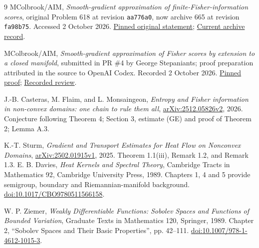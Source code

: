 \documentclass[11pt]{article}
\begin{document}
\begin{thebibliography}{9}
MColbrook/AIM, \emph{Smooth-gradient approximation of finite-Fisher-information scores}, original Problem 618 at revision \texttt{aa776a0}, now archive 665 at revision \texttt{fa98b75}. Accessed 2 October 2026.\newline
\href{https://github.com/MColbrook/AIM/blob/aa776a01d7d48a79f93251af11fde9454b0aea95/problems/618-fisher-score-gradient-closure.md}{Pinned original statement};
\href{https://github.com/MColbrook/AIM/blob/fa98b7525fa3f78317536a8825f9cfa0ae1c369c/research/resolved/665-fisher-score-gradient-closure.md}{Current archive record}.

MColbrook/AIM, \emph{Smooth-gradient approximation of Fisher scores by extension to a closed manifold}, submitted in PR \#4 by George Stepaniants; proof preparation attributed in the source to OpenAI Codex. Recorded 2 October 2026.\newline
\href{https://github.com/MColbrook/AIM/blob/fa98b7525fa3f78317536a8825f9cfa0ae1c369c/research/solutions/618-fisher-score/PROOF.md}{Pinned proof};
\href{https://github.com/MColbrook/AIM/blob/fa98b7525fa3f78317536a8825f9cfa0ae1c369c/research/solution_reviews/2026-10-02/618-review.md}{Recorded review}.

J.-B. Casteras, M. Flaim, and L. Monsaingeon,
\emph{Entropy and Fisher information in non-convex domains: one chain to rule them all},
\href{https://arxiv.org/abs/2512.05826v2}{arXiv:2512.05826v2}, 2026.
Conjecture following Theorem 4; Section 3, estimate (GE) and proof of Theorem 2; Lemma A.3.

K.-T. Sturm,
\emph{Gradient and Transport Estimates for Heat Flow on Nonconvex Domains},
\href{https://arxiv.org/abs/2502.01915v1}{arXiv:2502.01915v1}, 2025.
Theorem 1.1(iii), Remark 1.2, and Remark 1.3.
E. B. Davies,
\emph{Heat Kernels and Spectral Theory},
Cambridge Tracts in Mathematics 92, Cambridge University Press, 1989.
Chapters 1, 4 and 5 provide semigroup, boundary and Riemannian-manifold background.
\href{https://doi.org/10.1017/CBO9780511566158}{doi:10.1017/CBO9780511566158}.

W. P. Ziemer,
\emph{Weakly Differentiable Functions: Sobolev Spaces and Functions of Bounded Variation},
Graduate Texts in Mathematics 120, Springer, 1989.
Chapter 2, ``Sobolev Spaces and Their Basic Properties'', pp. 42--111.
\href{https://doi.org/10.1007/978-1-4612-1015-3}{doi:10.1007/978-1-4612-1015-3}.
\end{thebibliography}
\end{document}
